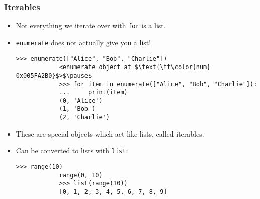 \documentclass[notes]{beamer}
\begin{document}
	\begin{frame}[fragile]
		\frametitle{Iterables}
		
		\begin{itemize}
			\item Not everything we iterate over with \lstinline|for| is a list.
			
			\pause
			
			\item \lstinline|enumerate| does not actually give you a list!
			\begin{lstlisting}[xleftmargin=\dimexpr-\leftmargini, basicstyle=\scriptsize\tt]
			>>> enumerate(["Alice", "Bob", "Charlie"])
			<enumerate object at $\text{\tt\color{num} 0x005FA2B0}$>$\pause$
			>>> for item in enumerate(["Alice", "Bob", "Charlie"]):
			...     print(item)
			(0, 'Alice')
			(1, 'Bob')
			(2, 'Charlie')
			\end{lstlisting}
			
			\pause
			
			\item These are special objects which act like lists, called \colorbox{jargonbg}{iterables}.
			
			\item Can be converted to lists with \lstinline|list|:
			\begin{lstlisting}[xleftmargin=\dimexpr-\leftmargini]
			>>> range(10)
			range(0, 10)
			>>> list(range(10))
			[0, 1, 2, 3, 4, 5, 6, 7, 8, 9]
			\end{lstlisting}
			
		\end{itemize}
	\end{frame}
	
\end{document}
